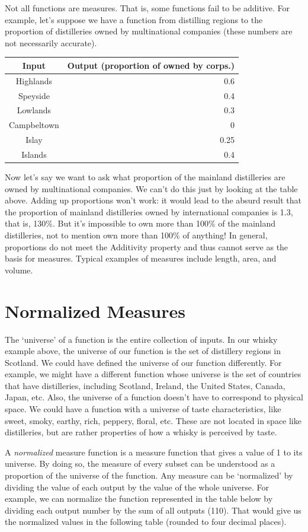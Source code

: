 \documentclass[]{tufte-book}
\begin{document}
Not all functions are measures. That is, some functions fail to be additive. For example, let's suppose we have a function from distilling regions to the proportion of distilleries owned by multinational companies (these numbers are not necessarily accurate).

\begin{longtable}[]{@{}cr@{}}
\toprule
Input & Output (proportion of owned by corps.)\tabularnewline
\midrule
\endhead
Highlands & 0.6\tabularnewline
Speyside & 0.4\tabularnewline
Lowlands & 0.3\tabularnewline
Campbeltown & 0\tabularnewline
Islay & 0.25\tabularnewline
Islands & 0.4\tabularnewline
\bottomrule
\end{longtable}

Now let's say we want to ask what proportion of the mainland distilleries are owned by multinational companies. We can't do this just by looking at the table above. Adding up proportions won't work: it would lead to the absurd result that the proportion of mainland distilleries owned by international companies is 1.3, that is, 130\%. But it's impossible to own more than 100\% of the mainland distilleries, not to mention own more than 100\% of anything! In general, proportions do not meet the Additivity property and thus cannot serve as the basis for measures. Typical examples of measures include length, area, and volume.

\hypertarget{normalized-measures}{%
\section{Normalized Measures}\label{normalized-measures}}

The `universe' of a function is the entire collection of inputs. In our whisky example above, the universe of our function is the set of distillery regions in Scotland. We could have defined the universe of our function differently. For example, we might have a different function whose universe is the set of countries that have distilleries, including Scotland, Ireland, the United States, Canada, Japan, etc. Also, the universe of a function doesn't have to correspond to physical space. We could have a function with a universe of taste characteristics, like sweet, smoky, earthy, rich, peppery, floral, etc. These are not located in space like distilleries, but are rather properties of how a whisky is perceived by taste.

A \emph{normalized} measure function is a measure function that gives a value of 1 to its universe. By doing so, the measure of every subset can be understood as a proportion of the universe of the function. Any measure can be `normalized' by dividing the value of each output by the value of the whole universe. For example, we can normalize the function represented in the table below by dividing each output number by the sum of all outputs (110). That would give us the normalized values in the following table (rounded to four decimal places).
\end{document}
